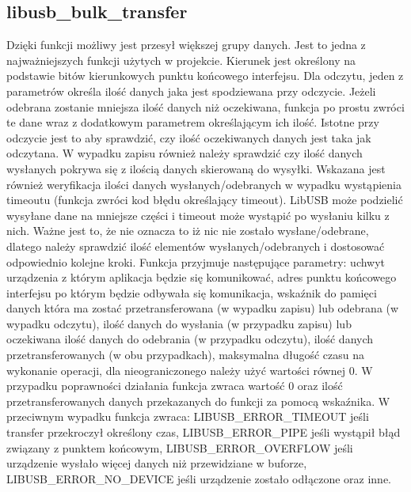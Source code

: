 \documentclass{BscUS}
\begin{document}
\subsection{libusb\_bulk\_transfer}
\noindent Dzięki funkcji możliwy jest przesył większej grupy danych. Jest to jedna z najważniejszych funkcji użytych w projekcie.
Kierunek jest określony na podstawie bitów kierunkowych punktu końcowego interfejsu.
Dla odczytu, jeden z parametrów określa ilość danych jaka jest spodziewana przy odczycie. Jeżeli odebrana zostanie mniejsza ilość danych niż oczekiwana, funkcja po prostu zwróci te dane wraz z dodatkowym parametrem określającym ich ilość. Istotne przy odczycie jest to aby sprawdzić, czy ilość oczekiwanych danych jest taka jak odczytana.
W wypadku zapisu również należy sprawdzić czy ilość danych wysłanych pokrywa się z ilością danych skierowaną do wysyłki.
Wskazana jest również weryfikacja ilości danych wysłanych/odebranych w wypadku wystąpienia timeoutu (funkcja zwróci kod błędu określający timeout). LibUSB może podzielić wysyłane dane na mniejsze części i timeout może wystąpić po wysłaniu kilku z nich. Ważne jest to, że nie oznacza to iż nic nie zostało wysłane/odebrane, dlatego należy sprawdzić ilość elementów wysłanych/odebranych i dostosować odpowiednio kolejne kroki.
Funkcja przyjmuje następujące parametry: uchwyt urządzenia z którym aplikacja będzie się komunikować, adres punktu końcowego interfejsu po którym będzie odbywała się komunikacja, wskaźnik do pamięci danych która ma zostać przetransferowana (w wypadku zapisu) lub odebrana (w wypadku odczytu), ilość danych do wysłania (w przypadku zapisu) lub oczekiwana ilość danych do odebrania (w przypadku odczytu), ilość danych przetransferowanych (w obu przypadkach), maksymalna długość czasu na wykonanie operacji, dla nieograniczonego należy użyć wartości równej 0.
W przypadku poprawności działania funkcja zwraca wartość 0 oraz ilość przetransferowanych danych przekazanych do funkcji za pomocą wskaźnika.
W przeciwnym wypadku funkcja zwraca: LIBUSB\_ERROR\_TIMEOUT jeśli transfer przekroczył określony czas, LIBUSB\_ERROR\_PIPE jeśli wystąpił błąd związany z punktem końcowym, LIBUSB\_ERROR\_OVERFLOW jeśli urządzenie wysłało więcej danych niż przewidziane w buforze, LIBUSB\_ERROR\_NO\_DEVICE jeśli urządzenie zostało odłączone oraz inne.
\end{document}

